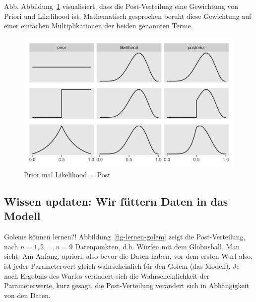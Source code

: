 \documentclass[
  a4paper,
  DIV=11]{scrreprt}
\theoremstyle{definition}
\theoremstyle{remark}
\begin{document}
Abb. Abbildung~\ref{fig-post3} visualisiert, dass die Post-Verteilung
eine Gewichtung von Priori und Likelihood ist. Mathematisch gesprochen
beruht diese Gewichtung auf einer einfachen Multiplikationen der beiden
genannten Terme.

\begin{figure}

{\centering \includegraphics{./img/img241.png}

}

\caption{\label{fig-post3}Prior mal Likelihood = Post}

\end{figure}

\hypertarget{wissen-updaten-wir-fuxfcttern-daten-in-das-modell}{%
\subsection{Wissen updaten: Wir füttern Daten in das
Modell}\label{wissen-updaten-wir-fuxfcttern-daten-in-das-modell}}

Golems können lernen?! Abbildung~\ref{fig-lernen-golem} zeigt die
Post-Verteilung, nach \(n=1, 2, ...,n=9\) Datenpunkten, d.h. Würfen mit
dem Globusball. Man sieht: Am Anfang, apriori, also bevor die Daten
haben, vor dem ersten Wurf also, ist jeder Parameterwert gleich
wahrscheinlich für den Golem (das Modell). Je nach Ergebnis des Wurfes
verändert sich die Wahrscheinlichkeit der Parameterwerte, kurz gesagt,
die Post-Verteilung verändert sich in Abhängigkeit von den Daten.
\end{document}
